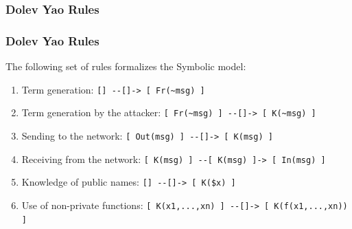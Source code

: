 \documentclass[aspectratio=169,t,xcolor=table]{beamer}
\begin{document}
\subsubsection{Dolev Yao Rules}

\begin{frame}
    \frametitle{Dolev Yao Rules}
    The following set of rules formalizes the Symbolic model:

    \begin{enumerate}
        \item Term generation: \lstinline|[] --[]-> [ Fr(~msg) ]|
        \item Term generation by the attacker: \lstinline|[ Fr(~msg) ] --[]-> [ K(~msg) ]|
        \item Sending to the network: \lstinline|[ Out(msg) ] --[]-> [ K(msg) ]|
        \item Receiving from the network: \lstinline|[ K(msg) ] --[ K(msg) ]-> [ In(msg) ]|
        \item Knowledge of public names: \lstinline|[] --[]-> [ K($x) ]|
        \item Use of non-private functions: \lstinline|[ K(x1,...,xn) ] --[]-> [ K(f(x1,...,xn)) ]|
    \end{enumerate}
\end{frame}
\end{document}
